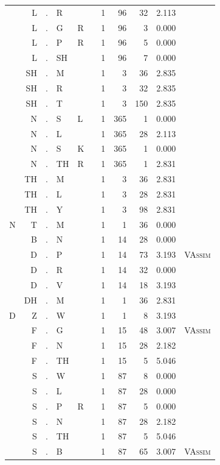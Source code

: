 \documentclass[12pt]{article}
\begin{document}
\begin{longtable}{r@{ } r@{ } c@{ } l@{ } l@{ } l@{ } r r r r l }
 & L & . & R &  &  & 1 & 96 & 32 & 2.113 &  \\
 & L & . & G & R &  & 1 & 96 & 3 & 0.000 &  \\
 & L & . & P & R &  & 1 & 96 & 5 & 0.000 &  \\
 & L & . & SH &  &  & 1 & 96 & 7 & 0.000 &  \\
 & SH & . & M &  &  & 1 & 3 & 36 & 2.835 &  \\
 & SH & . & R &  &  & 1 & 3 & 32 & 2.835 &  \\
 & SH & . & T &  &  & 1 & 3 & 150 & 2.835 &  \\
 & N & . & S & L &  & 1 & 365 & 1 & 0.000 &  \\
 & N & . & L &  &  & 1 & 365 & 28 & 2.113 &  \\
 & N & . & S & K &  & 1 & 365 & 1 & 0.000 &  \\
 & N & . & TH & R &  & 1 & 365 & 1 & 2.831 &  \\
 & TH & . & M &  &  & 1 & 3 & 36 & 2.831 &  \\
 & TH & . & L &  &  & 1 & 3 & 28 & 2.831 &  \\
 & TH & . & Y &  &  & 1 & 3 & 98 & 2.831 &  \\
N & T & . & M &  &  & 1 & 1 & 36 & 0.000 &  \\
 & B & . & N &  &  & 1 & 14 & 28 & 0.000 &  \\
 & D & . & P &  &  & 1 & 14 & 73 & 3.193 & \textsc{VAssim} \\
 & D & . & R &  &  & 1 & 14 & 32 & 0.000 &  \\
 & D & . & V &  &  & 1 & 14 & 18 & 3.193 &  \\
 & DH & . & M &  &  & 1 & 1 & 36 & 2.831 &  \\
D & Z & . & W &  &  & 1 & 1 & 8 & 3.193 &  \\
 & F & . & G &  &  & 1 & 15 & 48 & 3.007 & \textsc{VAssim} \\
 & F & . & N &  &  & 1 & 15 & 28 & 2.182 &  \\
 & F & . & TH &  &  & 1 & 15 & 5 & 5.046 &  \\
 & S & . & W &  &  & 1 & 87 & 8 & 0.000 &  \\
 & S & . & L &  &  & 1 & 87 & 28 & 0.000 &  \\
 & S & . & P & R &  & 1 & 87 & 5 & 0.000 &  \\
 & S & . & N &  &  & 1 & 87 & 28 & 2.182 &  \\
 & S & . & TH &  &  & 1 & 87 & 5 & 5.046 &  \\
 & S & . & B &  &  & 1 & 87 & 65 & 3.007 & \textsc{VAssim} \\

\end{longtable}
\end{document}
